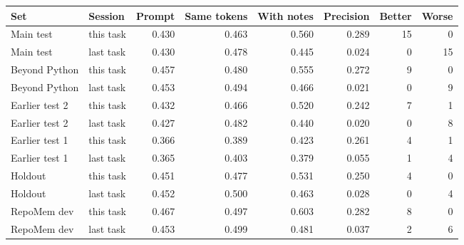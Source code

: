 \begin{tabular}{@{}llrrrrrr@{}}\toprule
Set & Session & Prompt & Same tokens & With notes & Precision & Better & Worse \\\midrule
Main test & this task & 0.430 & 0.463 & 0.560 & 0.289 & 15 & 0 \\
Main test & last task & 0.430 & 0.478 & 0.445 & 0.024 & 0 & 15 \\
Beyond Python & this task & 0.457 & 0.480 & 0.555 & 0.272 & 9 & 0 \\
Beyond Python & last task & 0.453 & 0.494 & 0.466 & 0.021 & 0 & 9 \\
Earlier test 2 & this task & 0.432 & 0.466 & 0.520 & 0.242 & 7 & 1 \\
Earlier test 2 & last task & 0.427 & 0.482 & 0.440 & 0.020 & 0 & 8 \\
Earlier test 1 & this task & 0.366 & 0.389 & 0.423 & 0.261 & 4 & 1 \\
Earlier test 1 & last task & 0.365 & 0.403 & 0.379 & 0.055 & 1 & 4 \\
Holdout & this task & 0.451 & 0.477 & 0.531 & 0.250 & 4 & 0 \\
Holdout & last task & 0.452 & 0.500 & 0.463 & 0.028 & 0 & 4 \\
RepoMem dev & this task & 0.467 & 0.497 & 0.603 & 0.282 & 8 & 0 \\
RepoMem dev & last task & 0.453 & 0.499 & 0.481 & 0.037 & 2 & 6 \\
\bottomrule\end{tabular}